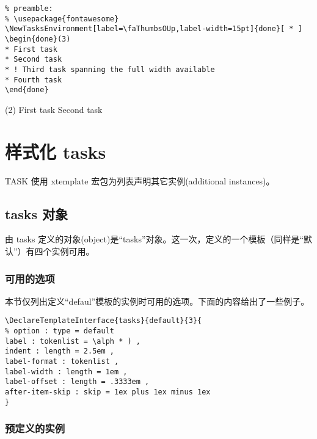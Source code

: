 \documentclass[a4paper,12pt,indent]{article}
\begin{document}
\begin{tcolorbox}[collower=black,colframe=Tasks,colback=white]
    \begin{lstlisting}
% preamble:
% \usepackage{fontawesome}
\NewTasksEnvironment[label=\faThumbsOUp,label-width=15pt]{done}[ * ]
\begin{done}(3)
* First task
* Second task
* ! Third task spanning the full width available
* Fourth task
\end{done}
\end{lstlisting}
        \tcblower
\begin{tasks}(2)
\task[$\nabla $] First task
\task[>>>>] Second task
\end{tasks}
           \end{tcolorbox}


\section{样式化 tasks}

TASK 使用 xtemplate 宏包为列表声明其它实例(additional instances)。

\subsection{tasks 对象}

由 tasks 定义的对象(object)是“tasks”对象。这一次，定义的一个模板（同样是“默认”）有四个实例可用。

\subsubsection{可用的选项}

本节仅列出定义“defaul”模板的实例时可用的选项。下面的内容给出了一些例子。

\begin{tcolorbox}[collower=black,colframe=Tasks,colback=white]
    \begin{lstlisting}
\DeclareTemplateInterface{tasks}{default}{3}{
% option : type = default
label : tokenlist = \alph * ) ,
indent : length = 2.5em ,
label-format : tokenlist ,
label-width : length = 1em ,
label-offset : length = .3333em ,
after-item-skip : skip = 1ex plus 1ex minus 1ex
}
\end{lstlisting}
    \end{tcolorbox}

\subsubsection{预定义的实例}
\end{document}
